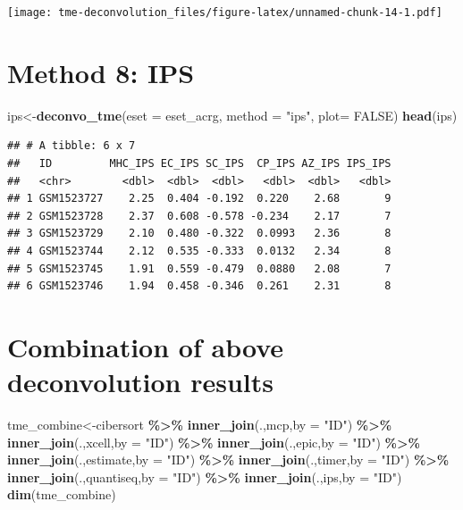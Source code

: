 \documentclass[
  12pt,
]{book}
\newenvironment{Shaded}{\begin{snugshade}}{\end{snugshade}}
\newcommand{\AttributeTok}[1]{\textcolor[rgb]{0.13,0.29,0.53}{#1}}
\newcommand{\ConstantTok}[1]{\textcolor[rgb]{0.56,0.35,0.01}{#1}}
\newcommand{\FunctionTok}[1]{\textcolor[rgb]{0.13,0.29,0.53}{\textbf{#1}}}
\newcommand{\NormalTok}[1]{#1}
\newcommand{\OtherTok}[1]{\textcolor[rgb]{0.56,0.35,0.01}{#1}}
\newcommand{\SpecialCharTok}[1]{\textcolor[rgb]{0.81,0.36,0.00}{\textbf{#1}}}
\newcommand{\StringTok}[1]{\textcolor[rgb]{0.31,0.60,0.02}{#1}}
\begin{document}
\texttt{[image: tme-deconvolution\_files/figure-latex/unnamed-chunk-14-1.pdf]}

\hypertarget{method-8-ips}{%
\section{Method 8: IPS}\label{method-8-ips}}

\begin{Shaded}
\begin{Highlighting}[]
\NormalTok{ips}\OtherTok{\textless{}{-}}\FunctionTok{deconvo\_tme}\NormalTok{(}\AttributeTok{eset =}\NormalTok{ eset\_acrg, }\AttributeTok{method =} \StringTok{"ips"}\NormalTok{, }\AttributeTok{plot=} \ConstantTok{FALSE}\NormalTok{)}
\FunctionTok{head}\NormalTok{(ips)}
\end{Highlighting}
\end{Shaded}

\begin{verbatim}
## # A tibble: 6 x 7
##   ID         MHC_IPS EC_IPS SC_IPS  CP_IPS AZ_IPS IPS_IPS
##   <chr>        <dbl>  <dbl>  <dbl>   <dbl>  <dbl>   <dbl>
## 1 GSM1523727    2.25  0.404 -0.192  0.220    2.68       9
## 2 GSM1523728    2.37  0.608 -0.578 -0.234    2.17       7
## 3 GSM1523729    2.10  0.480 -0.322  0.0993   2.36       8
## 4 GSM1523744    2.12  0.535 -0.333  0.0132   2.34       8
## 5 GSM1523745    1.91  0.559 -0.479  0.0880   2.08       7
## 6 GSM1523746    1.94  0.458 -0.346  0.261    2.31       8
\end{verbatim}

\hypertarget{combination-of-above-deconvolution-results}{%
\section{Combination of above deconvolution results}\label{combination-of-above-deconvolution-results}}

\begin{Shaded}
\begin{Highlighting}[]
\NormalTok{tme\_combine}\OtherTok{\textless{}{-}}\NormalTok{cibersort }\SpecialCharTok{\%\textgreater{}\%} 
  \FunctionTok{inner\_join}\NormalTok{(.,mcp,}\AttributeTok{by       =} \StringTok{"ID"}\NormalTok{) }\SpecialCharTok{\%\textgreater{}\%} 
  \FunctionTok{inner\_join}\NormalTok{(.,xcell,}\AttributeTok{by     =} \StringTok{"ID"}\NormalTok{) }\SpecialCharTok{\%\textgreater{}\%}
  \FunctionTok{inner\_join}\NormalTok{(.,epic,}\AttributeTok{by      =} \StringTok{"ID"}\NormalTok{) }\SpecialCharTok{\%\textgreater{}\%} 
  \FunctionTok{inner\_join}\NormalTok{(.,estimate,}\AttributeTok{by  =} \StringTok{"ID"}\NormalTok{) }\SpecialCharTok{\%\textgreater{}\%} 
  \FunctionTok{inner\_join}\NormalTok{(.,timer,}\AttributeTok{by     =} \StringTok{"ID"}\NormalTok{) }\SpecialCharTok{\%\textgreater{}\%} 
  \FunctionTok{inner\_join}\NormalTok{(.,quantiseq,}\AttributeTok{by =} \StringTok{"ID"}\NormalTok{) }\SpecialCharTok{\%\textgreater{}\%} 
  \FunctionTok{inner\_join}\NormalTok{(.,ips,}\AttributeTok{by       =} \StringTok{"ID"}\NormalTok{)}
\FunctionTok{dim}\NormalTok{(tme\_combine)}
\end{Highlighting}
\end{Shaded}
\end{document}
